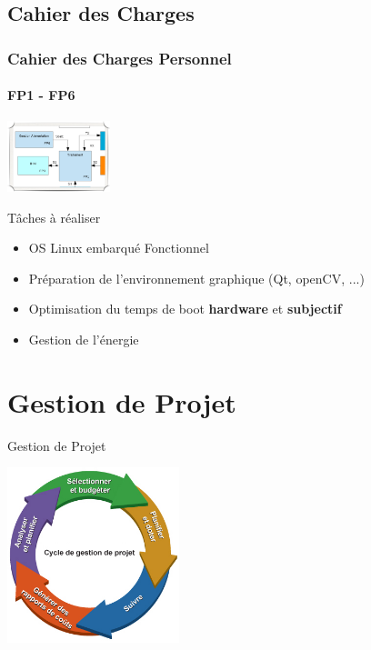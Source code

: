\documentclass[11pt]{beamer}
\begin{document}
	\subsection{Cahier des Charges}
	\begin{frame}
		\frametitle{Cahier des Charges Personnel}
		\framesubtitle{FP1 - FP6}
		\begin{center}
				\includegraphics[width=3cm]{common/cdcperso.png}	\\ 
		\end{center}
	\begin{block}{Tâches à réaliser}
		\begin{itemize}
			\item OS Linux embarqué Fonctionnel
			\item Préparation de l'environnement graphique (Qt, openCV, ...)
			\item Optimisation du temps de boot \textbf{hardware} et \textbf{subjectif}
			\item Gestion de l'énergie
		\end{itemize}
	\end{block}
	
	\end{frame}
	
	
	
	\section{Gestion de Projet}
	
	\begin{frame}{Gestion de Projet}
		\begin{center}
			\includegraphics[width=5cm]{common/gestion.jpg}
		\end{center}
	\end{frame}
	
\end{document}
